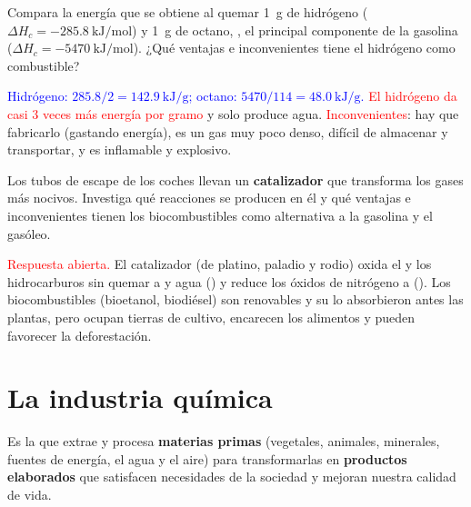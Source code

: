 \begin{exercise}
    Compara la energía que se obtiene al quemar \qty{1}{\gram} de hidrógeno (\(\Delta H_c = \qty{-285.8}{\kilo\joule\per\mol}\)) y
    \qty{1}{\gram} de octano, , el principal componente de la gasolina (\(\Delta H_c = \qty{-5470}{\kilo\joule\per\mol}\)).
    ¿Qué ventajas e inconvenientes tiene el hidrógeno como combustible?
    \begin{solu}
        \textcolor{blue}{Hidrógeno: \(\num{285.8}/2 = \qty{142.9}{\kilo\joule\per\gram}\); octano: \(5470/114 = \qty{48.0}{\kilo\joule\per\gram}\).}
        \textcolor{red}{El hidrógeno da casi 3 veces más energía por gramo} y solo produce agua. \textcolor{red}{Inconvenientes}:
        hay que fabricarlo (gastando energía), es un gas muy poco denso, difícil de almacenar y transportar, y es inflamable y
        explosivo.
    \end{solu}
\end{exercise}

\begin{exercise}
    Los tubos de escape de los coches llevan un \textbf{catalizador} que transforma los gases más nocivos. Investiga qué reacciones
    se producen en él y qué ventajas e inconvenientes tienen los biocombustibles como alternativa a la gasolina y el gasóleo.
    \begin{solu}
        \textcolor{red}{Respuesta abierta.} El catalizador (de platino, paladio y rodio) oxida el  y los hidrocarburos sin
        quemar a  y agua () y reduce los óxidos de nitrógeno a 
        (). Los biocombustibles (bioetanol, biodiésel) son renovables y su  lo absorbieron
        antes las plantas, pero ocupan tierras de cultivo, encarecen los alimentos y pueden favorecer la deforestación.
    \end{solu}
\end{exercise}

\section{La industria química}\label{sec:ud6-industria}

\begin{definition}
    Es la que extrae y procesa \textbf{materias primas} (vegetales, animales, minerales, fuentes de energía, el agua y el aire) para
    transformarlas en \textbf{productos elaborados} que satisfacen necesidades de la sociedad y mejoran nuestra calidad de vida.
\end{definition}

